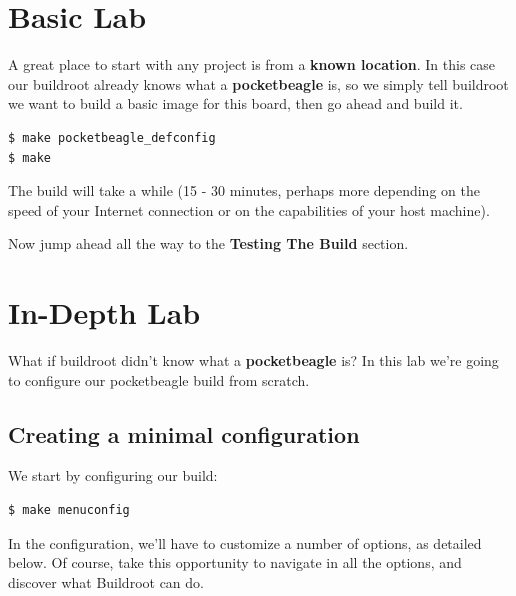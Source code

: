 \documentclass[a4paper,12pt,obeyspaces,spaces,hyphens]{article}
\begin{document}
\section{Basic Lab}

A great place to start with any project is from a {\bf known location}. In
this case our buildroot already knows what a {\bf pocketbeagle} is, so we
simply tell buildroot we want to build a basic image for this board, then go
ahead and build it.

\begin{verbatim}
$ make pocketbeagle_defconfig
$ make
\end{verbatim}

The build will take a while (15 - 30 minutes, perhaps more depending on the
speed of your Internet connection or on the capabilities of your host
machine).

Now jump ahead all the way to the {\bf Testing The Build} section.

\section{In-Depth Lab}

What if buildroot didn't know what a {\bf pocketbeagle} is? In this lab we're
going to configure our pocketbeagle build from scratch.

\subsection{Creating a minimal configuration}

We start by configuring our build:

\begin{verbatim}
$ make menuconfig
\end{verbatim}

In the configuration, we'll have to customize a number of options, as
detailed below. Of course, take this opportunity to navigate in all
the options, and discover what Buildroot can do.
\end{document}
